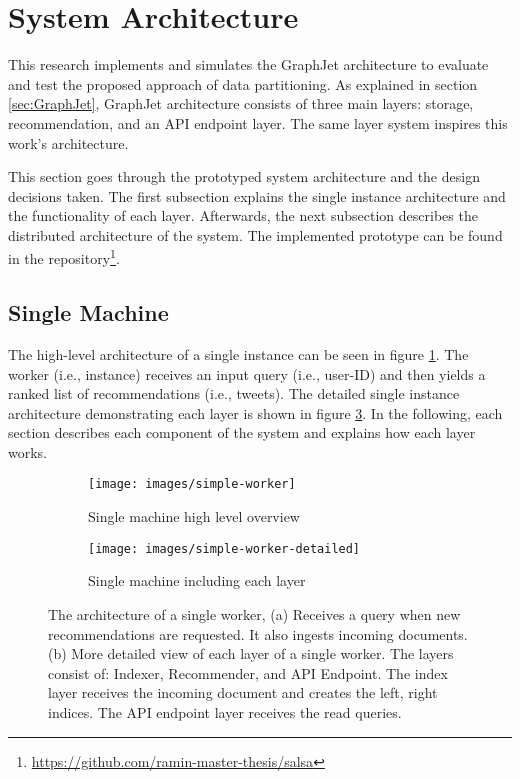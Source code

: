 \section{System Architecture}
\label{sec:system-architecture}

This research implements and simulates the GraphJet architecture to evaluate and test the proposed approach of data partitioning. As explained in section \ref{sec:GraphJet}, GraphJet architecture consists of three main layers: storage, recommendation, and an API endpoint layer. The same layer system inspires this work's architecture. 


This section goes through the prototyped system architecture and the design decisions taken. The first subsection explains the single instance architecture and the functionality of each layer. Afterwards, the next subsection describes the distributed architecture of the system. The implemented prototype can be found in the repository\footnote{\url{https://github.com/ramin-master-thesis/salsa}}.


\subsection{Single Machine}
\label{subsec:single-machine}
The high-level architecture of a single instance can be seen in figure \ref{fig:single-machine-architecture}. The worker (i.e., instance) receives an input query (i.e., user-ID) and then yields a ranked list of recommendations (i.e., tweets). The detailed single instance architecture demonstrating each layer is shown in figure \ref{fig:single-machine-architecture-detailed}. In the following, each section describes each component of the system and explains how each layer works.

\begin{figure}[!htb]
    \centering
    \begin{subfigure}[b]{0.75\textwidth}
       \texttt{[image: images/simple-worker]}
       \caption{Single machine high level overview}
       \label{fig:single-machine-architecture} 
    \end{subfigure}
    
    \begin{subfigure}[b]{0.8\textwidth}
       \texttt{[image: images/simple-worker-detailed]}
       \caption{Single machine including each layer}
       \label{fig:single-machine-architecture-detailed}
    \end{subfigure}
    
    \caption {The architecture of a single worker, (a) Receives a query when new recommendations are requested. It also ingests incoming documents. (b) More detailed view of each layer of a single worker. The layers consist of: Indexer, Recommender, and API Endpoint. The index layer receives the incoming document and creates the left, right indices. The API endpoint layer receives the read queries.}
\end{figure}


